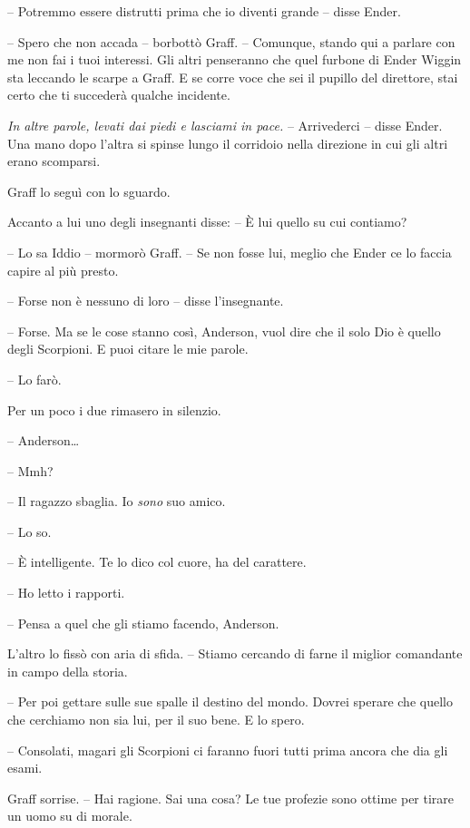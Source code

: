 {-- Potremmo essere distrutti prima che io diventi grande -- disse
	Ender.}

{-- Spero che non accada -- borbottò Graff. -- Comunque, stando qui a
	parlare con me non fai i tuoi interessi. Gli altri penseranno che quel
	furbone di Ender Wiggin sta leccando le scarpe a Graff. E se corre voce
	che sei il pupillo del direttore, stai certo che ti succederà qualche
	incidente.}

\emph{{In altre parole, levati dai piedi e lasciami in pace. }}{--
	Arrivederci -- disse Ender. Una mano dopo l'altra si spinse lungo il
	corridoio nella direzione in cui gli altri erano scomparsi.}

{Graff lo seguì con lo sguardo.}

{Accanto a lui uno degli insegnanti disse: -- È lui quello su cui
	contiamo?}

{-- Lo sa Iddio -- mormorò Graff. -- Se non fosse lui, meglio che Ender
	ce lo faccia capire al più presto.}

{-- Forse non è nessuno di loro -- disse l'insegnante.}

{-- Forse. Ma se le cose stanno così, Anderson, vuol dire che il solo
	Dio è quello degli Scorpioni. E puoi citare le mie parole.}

{-- Lo farò.}

{Per un poco i due rimasero in silenzio.}

{-- Anderson\ldots{}}

{-- Mmh?}

{-- Il ragazzo sbaglia. Io \emph{sono} suo amico.}

{-- Lo so.}

{-- È intelligente. Te lo dico col cuore, ha del carattere.}

{-- Ho letto i rapporti.}

{-- Pensa a quel che gli stiamo facendo, Anderson.}

{L'altro lo fissò con aria di sfida. -- Stiamo cercando di farne il
	miglior comandante in campo della storia.}

{-- Per poi gettare sulle sue spalle il destino del mondo. Dovrei
	sperare che quello che cerchiamo non sia lui, per il suo bene. E lo
	spero.}

{-- Consolati, magari gli Scorpioni ci faranno fuori tutti prima ancora
	che dia gli esami.}

{Graff sorrise. -- Hai ragione. Sai una cosa? Le tue profezie sono
	ottime per tirare un uomo su di morale.}

\label{Orsonux20Scottux20Cardux20-ux20Ilux20Giocoux20Diux20Enderux20-ux20BY_SLY70A1_split_007.htm}{}
